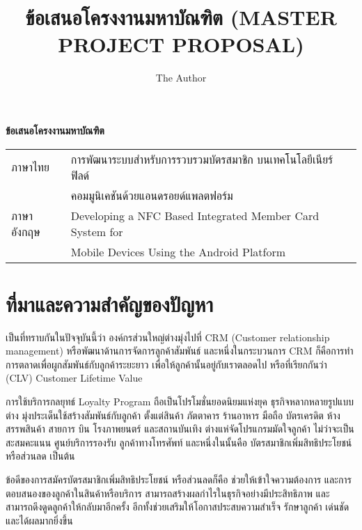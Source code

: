 \documentclass[a4paper]{article}
\title{ข้อเสนอโครงงานมหาบัณฑิต (MASTER PROJECT PROPOSAL)}
\author{The Author}
\newcommand{\MarginText}[1]{\marginpar{\raggedleft\itshape\small#1}} %
\newcommand{\Description}[1]{\hangindent=2em\hangafter=0\noindent\raggedright\footnotesize{#1}\par\normalsize\vspace{1em}}
\begin{document}

\begin{center}
{\huge \bf ข้อเสนอโครงงานมหาบัณฑิต}
\end{center}


\Large{\noindent\hspace{0.7cm}\setlength{\tabcolsep}{15pt}
\begin{tabular}{l l}    
	ภาษาไทย 	& การพัฒนาระบบสำหรับการรวบรวมบัตรสมาชิก บนเทคโนโลยีเนียร์ฟิลด์ \\
				& คอมมูนิเคชันด้วยแอนดรอยด์แพลตฟอร์ม \\
	ภาษาอังกฤษ	& Developing a NFC Based Integrated Member Card System for \\
				& Mobile Devices Using the Android Platform \\    
\end{tabular}
}

\section{ที่มาและความสำคัญของปัญหา}

เป็นที่ทราบกันในปัจจุบันนี้ว่า องค์กรส่วนใหญ่ต่างมุ่งไปที่ CRM (Customer relationship management) หรือพัฒนาด้านการจัดการลูกค้าสัมพันธ์ 
และหนึ่งในกระบวนการ CRM ก็คือการทําการตลาดเพื่อผูกสัมพันธ์กับลูกค้าระยะยาว เพื่อให้ลูกค้านั้นอยู่กับเราตลอดไป หรือที่เรียกกันว่า (CLV) Customer Lifetime Value

การใช้บริการกลยุทธ์ Loyalty Program ถือเป็นโปรโมชั่นยอดนิยมแห่งยุค ธุรกิจหลากหลายรูปแบบต่าง
มุ่งประเด็นใช้สร้างสัมพันธ์กับลูกค้า ตั้งแต่สินค้า ภัตตาคาร ร้านอาหาร มือถือ บัตรเครดิต ห้างสรรพสินค้า สายการ
บิน โรงภาพยนตร์ และสถานบันเทิง ต่างแห่จัดโปรแกรมมัดใจลูกค้า ไม่ว่าจะเป็นสะสมคะแนน ศูนย์บริการรองรับ
ลูกค้าทางโทรศัพท์ และหนึ่งในนั้นคือ บัตรสมาชิกเพิ่มสิทธิประโยชน์ หรือส่วนลด เป็นต้น

ข้อดีของการสมัครบัตรสมาชิกเพิ่มสิทธิประโยชน์ หรือส่วนลดก็คือ ช่วยให้เข้าใจความต้องการ และการตอบสนองของลูกค้าในสินค้าหรือบริการ สามารถสร้างผลกําไรในธุรกิจอย่างมีประสิทธิภาพ และสามารถดึงดูดลูกค้าให้กลับมาอีกครั้ง อีกทั้งช่วยเสริมให้โอกาสประสบความสําเร็จ รักษาลูกค้า เด่นชัด และได้ผลมากยิ่งขึ้น
\end{document}
